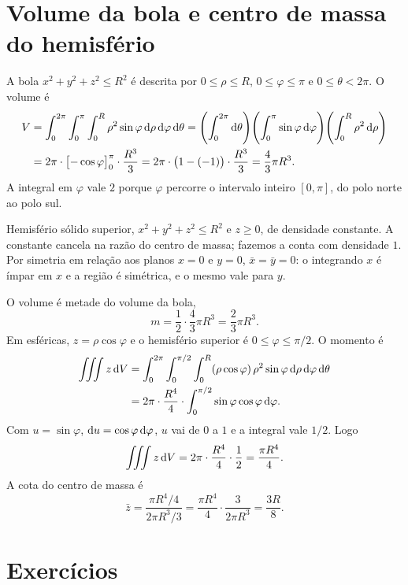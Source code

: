 \documentclass[11pt,a4paper]{article}
\begin{document}
\section{Volume da bola e centro de massa do hemisfério}

\begin{exemplo}
A bola $x^2+y^2+z^2\le R^2$ é descrita por $0\le\rho\le R$, $0\le\varphi\le\pi$ e $0\le\theta<2\pi$. O volume é
\begin{align*}
V
&=\int_0^{2\pi}\int_0^{\pi}\int_0^R \rho^2\sin\varphi\,\mathrm{d}\rho\,\mathrm{d}\varphi\,\mathrm{d}\theta
=\Biggl(\int_0^{2\pi}\mathrm{d}\theta\Biggr)
\Biggl(\int_0^{\pi}\sin\varphi\,\mathrm{d}\varphi\Biggr)
\Biggl(\int_0^R\rho^2\,\mathrm{d}\rho\Biggr)\\
&=2\pi\cdot\bigl[-\cos\varphi\bigr]_0^{\pi}\cdot\frac{R^3}{3}
=2\pi\cdot\bigl(1-(-1)\bigr)\cdot\frac{R^3}{3}
=\frac{4}{3}\pi R^3.
\end{align*}
A integral em $\varphi$ vale $2$ porque $\varphi$ percorre o intervalo inteiro $[0,\pi]$, do polo norte ao polo sul.
\end{exemplo}

\begin{exemplo}
Hemisfério sólido superior, $x^2+y^2+z^2\le R^2$ e $z\ge 0$, de densidade constante. A constante cancela na razão do centro de massa; fazemos a conta com densidade $1$. Por simetria em relação aos planos $x=0$ e $y=0$, $\bar x=\bar y=0$: o integrando $x$ é ímpar em $x$ e a região é simétrica, e o mesmo vale para $y$.

O volume é metade do volume da bola,
\[
m=\frac12\cdot\frac{4}{3}\pi R^3=\frac{2}{3}\pi R^3.
\]
Em esféricas, $z=\rho\cos\varphi$ e o hemisfério superior é $0\le\varphi\le\pi/2$. O momento é
\begin{align*}
\iiint z\,\mathrm{d} V
&=\int_0^{2\pi}\int_0^{\pi/2}\int_0^R (\rho\cos\varphi)\,\rho^2\sin\varphi\,\mathrm{d}\rho\,\mathrm{d}\varphi\,\mathrm{d}\theta\\
&=2\pi\cdot\frac{R^4}{4}\cdot\int_0^{\pi/2}\sin\varphi\cos\varphi\,\mathrm{d}\varphi.
\end{align*}
Com $u=\sin\varphi$, $\mathrm{d} u=\cos\varphi\,\mathrm{d}\varphi$, $u$ vai de $0$ a $1$ e a integral vale $1/2$. Logo
\[
\iiint z\,\mathrm{d} V=2\pi\cdot\frac{R^4}{4}\cdot\frac12=\frac{\pi R^4}{4}.
\]
A cota do centro de massa é
\[
\bar z=\frac{\pi R^4/4}{2\pi R^3/3}=\frac{\pi R^4}{4}\cdot\frac{3}{2\pi R^3}=\frac{3R}{8}.
\]
\end{exemplo}

\section{Exercícios}
\end{document}
